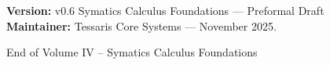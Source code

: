 \documentclass[11pt]{article}
\begin{document}
\bigskip
\noindent
\textcolor{tessarisgray}{\textbf{Version:}} v0.6 Symatics Calculus Foundations — Preformal Draft\\
\textcolor{tessarisgray}{\textbf{Maintainer:}} Tessaris Core Systems — November 2025.

\vfill
\begin{center}
{\small \textcolor{tessarisgray}{End of Volume IV – Symatics Calculus Foundations}}
\end{center}
\end{document}
